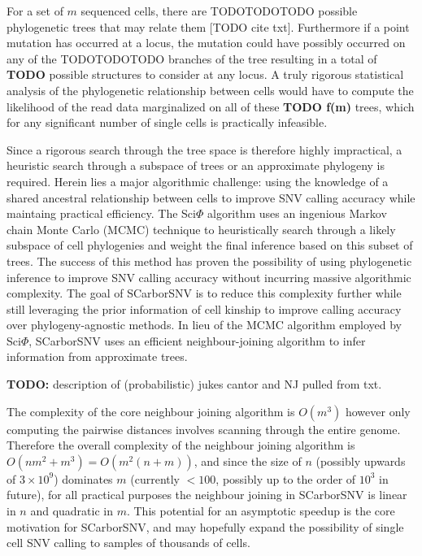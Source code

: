 \documentclass[../../main.tex]{subfiles}
\begin{document}
For a set of $m$ sequenced cells, there are TODOTODOTODO possible phylogenetic trees that may relate them [TODO cite txt].
Furthermore if a point mutation has occurred at a locus, the mutation could have possibly occurred on any of the TODOTODOTODO branches of the tree resulting in a total of \textbf{TODO} possible structures to consider at any locus.
A truly rigorous statistical analysis of the phylogenetic relationship between cells would have to compute the likelihood of the read data marginalized on all of these \textbf{TODO f(m)} trees, which for any significant number of single cells is practically infeasible.


Since a rigorous search through the tree space is therefore highly impractical, a heuristic search through a subspace of trees or an approximate phylogeny is required.
Herein lies a major algorithmic challenge: using the knowledge of a shared ancestral relationship between cells to improve SNV calling accuracy while maintaing practical efficiency.
The Sci$\Phi$ algorithm uses an ingenious Markov chain Monte Carlo (MCMC) technique to heuristically search through a likely subspace of cell phylogenies and weight the final inference based on this subset of trees.
The success of this method has proven the possibility of using phylogenetic inference to improve SNV calling accuracy without incurring massive algorithmic complexity.
The goal of SCarborSNV is to reduce this complexity further while still leveraging the prior information of cell kinship to improve calling accuracy over phylogeny-agnostic methods.
In lieu of the MCMC algorithm employed by Sci$\Phi$, SCarborSNV uses an efficient neighbour-joining algorithm to infer information from approximate trees.

\textbf{TODO:} description of (probabilistic) jukes cantor and NJ pulled from txt.

The complexity of the core neighbour joining algorithm is $O(m^3)$ however only computing the pairwise distances involves scanning through the entire genome.
Therefore the overall complexity of the neighbour joining algorithm is $O(nm^2 + m^3) = O(m^2(n+m))$, and since the size of $n$ (possibly upwards of $3\times10^9$) dominates $m$ (currently $<100$, possibly up to the order of $10^3$ in future), for all practical purposes the neighbour joining in SCarborSNV is linear in $n$ and quadratic in $m$.
This potential for an asymptotic speedup is the core motivation for SCarborSNV, and may hopefully expand the possibility of single cell SNV calling to samples of thousands of cells.
\end{document}
